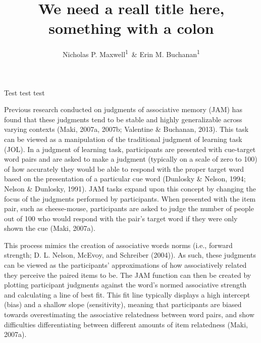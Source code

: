 \documentclass[english,man]{apa6}
\title{We need a reall title here, something with a colon}
\author{Nicholas P. Maxwell\textsuperscript{1}~\& Erin M. Buchanan\textsuperscript{1}}
\affiliation{
    \vspace{0.5cm}
          \textsuperscript{1} Missouri State University  }
\theoremstyle{definition}
\theoremstyle{definition}
\theoremstyle{remark}
\begin{document}
\maketitle

\setcounter{secnumdepth}{0}



Test test test

Previous research conducted on judgments of associative memory (JAM) has
found that these judgments tend to be stable and highly generalizable
across varying contexts (Maki, 2007a, 2007b; Valentine \& Buchanan,
2013). This task can be viewed as a manipulation of the traditional
judgment of learning task (JOL). In a judgment of learning task,
participants are presented with cue-target word pairs and are asked to
make a judgment (typically on a scale of zero to 100) of how accurately
they would be able to respond with the proper target word based on the
presentation of a particular cue word (Dunlosky \& Nelson, 1994; Nelson
\& Dunlosky, 1991). JAM tasks expand upon this concept by changing the
focus of the judgments performed by participants. When presented with
the item pair, such as cheese-mouse, participants are asked to judge the
number of people out of 100 who would respond with the pair's target
word if they were only shown the cue (Maki, 2007a).

This process mimics the creation of associative words norms (i.e.,
forward strength; D. L. Nelson, McEvoy, and Schreiber (2004)). As such,
these judgments can be viewed as the participants' approximations of how
associatively related they perceive the paired items to be. The JAM
function can then be created by plotting participant judgments against
the word's normed associative strength and calculating a line of best
fit. This fit line typically displays a high intercept (bias) and a
shallow slope (sensitivity), meaning that participants are biased
towards overestimating the associative relatedness between word pairs,
and show difficulties differentiating between different amounts of item
relatedness (Maki, 2007a).
\end{document}
